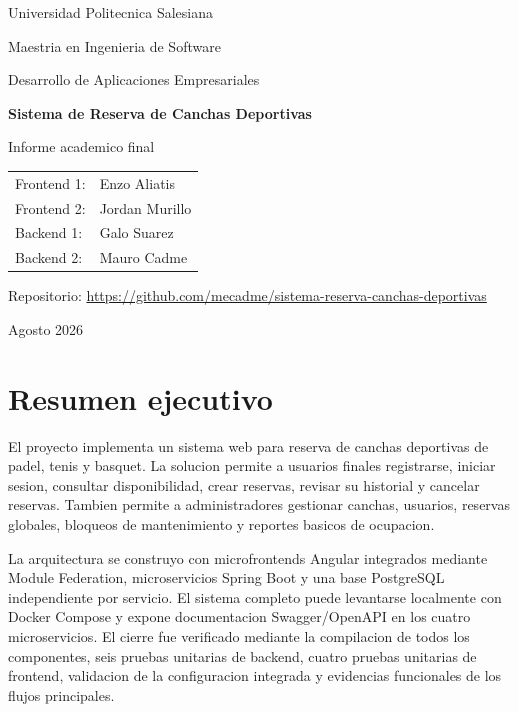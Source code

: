 \documentclass[12pt,a4paper]{article}
\begin{document}
\begin{titlepage}
  \centering
  {\Large Universidad Politecnica Salesiana\par}
  {\large Maestria en Ingenieria de Software\par}
  {\large Desarrollo de Aplicaciones Empresariales\par}
  \vfill
  {\Huge\bfseries Sistema de Reserva de Canchas Deportivas\par}
  \vspace{0.5cm}
  {\Large Informe academico final\par}
  \vfill
  \begin{tabular}{ll}
    Frontend 1: & Enzo Aliatis \\
    Frontend 2: & Jordan Murillo \\
    Backend 1: & Galo Suarez \\
    Backend 2: & Mauro Cadme \\
  \end{tabular}
  \vfill
  {\large Repositorio: \url{https://github.com/mecadme/sistema-reserva-canchas-deportivas}\par}
  \vfill
  {\large Agosto 2026\par}
\end{titlepage}

\tableofcontents
\newpage
{}

\section{Resumen ejecutivo}

El proyecto implementa un sistema web para reserva de canchas deportivas de padel, tenis y basquet. La solucion permite a usuarios finales registrarse, iniciar sesion, consultar disponibilidad, crear reservas, revisar su historial y cancelar reservas. Tambien permite a administradores gestionar canchas, usuarios, reservas globales, bloqueos de mantenimiento y reportes basicos de ocupacion.

La arquitectura se construyo con microfrontends Angular integrados mediante Module Federation, microservicios Spring Boot y una base PostgreSQL independiente por servicio. El sistema completo puede levantarse localmente con Docker Compose y expone documentacion Swagger/OpenAPI en los cuatro microservicios. El cierre fue verificado mediante la compilacion de todos los componentes, seis pruebas unitarias de backend, cuatro pruebas unitarias de frontend, validacion de la configuracion integrada y evidencias funcionales de los flujos principales.
\end{document}

